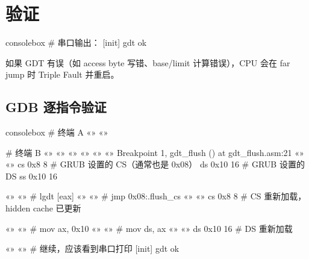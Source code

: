 \section{验证}

\begin{tcblisting}{consolebox}
# 串口输出：
[init] gdt ok
\end{tcblisting}

如果 GDT 有误（如 access byte 写错、base/limit 计算错误），CPU 会在
far jump 时 Triple Fault 并重启。

\subsection{GDB 逐指令验证}

\begin{tcblisting}{consolebox}
# 终端 A
«\tps{\$}» «»

# 终端 B
«\tps{\$}» «»
«» «»
«» «»
Breakpoint 1, gdt_flush () at gdt_flush.asm:21
«» «»
cs  0x8   8           # GRUB 设置的 CS（通常也是 0x08）
ds  0x10  16          # GRUB 设置的 DS
ss  0x10  16

«» «»              # lgdt [eax]
«» «»              # jmp 0x08:.flush_cs
«» «»
cs  0x8   8           # CS 重新加载，hidden cache 已更新

«» «»              # mov ax, 0x10
«» «»              # mov ds, ax
«» «»
ds  0x10  16          # DS 重新加载

«» «»               # 继续，应该看到串口打印 [init] gdt ok
\end{tcblisting}


